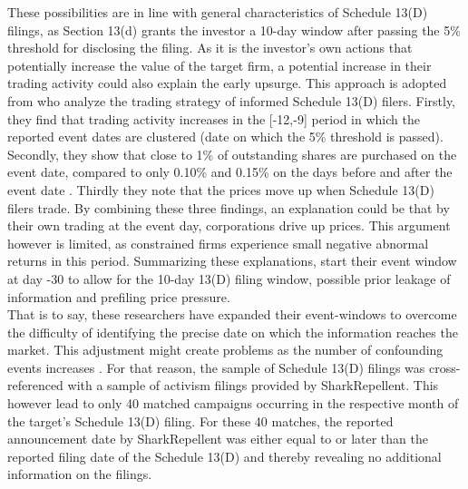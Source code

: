 \documentclass[12pt]{article}
\begin{document}
These possibilities are in line with general characteristics of Schedule 13(D) filings, as Section 13(d) grants the investor a 10-day window after passing the 5\% threshold for disclosing the filing. 
As it is the investor's own actions that potentially increase the value of the target firm, a potential increase in their trading activity could also explain the early upsurge. This approach is adopted from  \citet[p.1561]{Collin-Dufresne2015} who analyze the trading strategy of informed Schedule 13(D) filers. Firstly, they find that trading activity increases in the [-12,-9] period in which the reported event dates are clustered (date on which the 5\% threshold is passed). Secondly, they show that close to 1\% of outstanding shares are purchased on the event date, compared to only 0.10\% and 0.15\% on the days before and after the event date \citep[p.1561]{Collin-Dufresne2015}. Thirdly they note that the prices move up when Schedule 13(D) filers trade. By combining these three findings, an explanation could be that by their own trading at the event day, corporations drive up prices. This argument however is limited, as constrained firms experience small negative abnormal returns in this period. Summarizing these explanations, \citet[p.207]{Klein2009} start their event window at day -30 to allow for the 10-day 13(D) filing window, possible prior leakage of information and prefiling price pressure.\\
That is to say, these researchers have expanded their event-windows to overcome the difficulty of identifying the precise date on which the information reaches the market. This adjustment might create problems as the number of confounding events increases \citep[p.352]{mcwilliams1999}. For that reason, the sample of Schedule 13(D) filings was cross-referenced with a sample of activism filings provided by SharkRepellent. This however lead to only 40 matched campaigns occurring in the respective month of the target's Schedule 13(D) filing. For these 40 matches, the reported announcement date by SharkRepellent was either equal to or later than the reported filing date of the Schedule 13(D) and thereby revealing no additional information on the filings.
\end{document}
